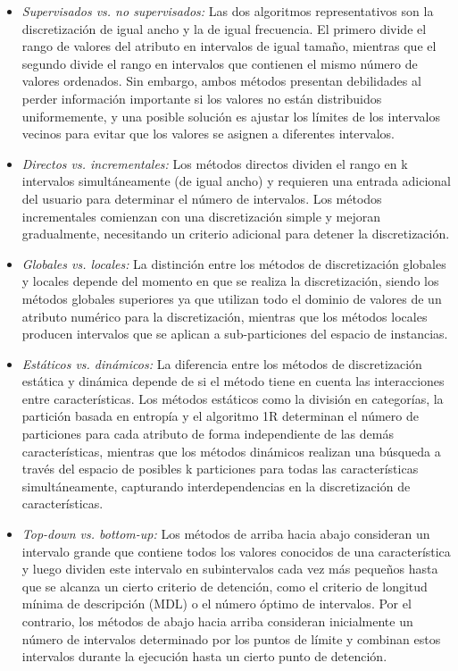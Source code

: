 \begin{itemize}
	\item \textit{Supervisados vs. no supervisados:} Las dos algoritmos representativos son la discretización de igual ancho y la de igual frecuencia. El primero divide el rango de valores del atributo en intervalos de igual tamaño, mientras que el segundo divide el rango en intervalos que contienen el mismo número de valores ordenados. Sin embargo, ambos métodos presentan debilidades al perder información importante si los valores no están distribuidos uniformemente, y una posible solución es ajustar los límites de los intervalos vecinos para evitar que los valores se asignen a diferentes intervalos.
	\item \textit{Directos vs. incrementales:} Los métodos directos dividen el rango en k intervalos simultáneamente (de igual ancho) y requieren una entrada adicional del usuario para determinar el número de intervalos. Los métodos incrementales comienzan con una discretización simple y mejoran gradualmente, necesitando un criterio adicional para detener la discretización. 
	\item \textit{Globales vs. locales:} La distinción entre los métodos de discretización globales y locales depende del momento en que se realiza la discretización, siendo los métodos globales superiores ya que utilizan todo el dominio de valores de un atributo numérico para la discretización, mientras que los métodos locales producen intervalos que se aplican a sub-particiones del espacio de instancias.
	\item \textit{Estáticos vs. dinámicos:} La diferencia entre los métodos de discretización estática y dinámica depende de si el método tiene en cuenta las interacciones entre características. Los métodos estáticos como la división en categorías, la partición basada en entropía y el algoritmo 1R determinan el número de particiones para cada atributo de forma independiente de las demás características, mientras que los métodos dinámicos realizan una búsqueda a través del espacio de posibles k particiones para todas las características simultáneamente, capturando interdependencias en la discretización de características.
	\item \textit{Top-down vs. bottom-up:} Los métodos de arriba hacia abajo consideran un intervalo grande que contiene todos los valores conocidos de una característica y luego dividen este intervalo en subintervalos cada vez más pequeños hasta que se alcanza un cierto criterio de detención, como el criterio de longitud mínima de descripción (MDL) o el número óptimo de intervalos. Por el contrario, los métodos de abajo hacia arriba consideran inicialmente un número de intervalos determinado por los puntos de límite y combinan estos intervalos durante la ejecución hasta un cierto punto de detención.
\end{itemize}
